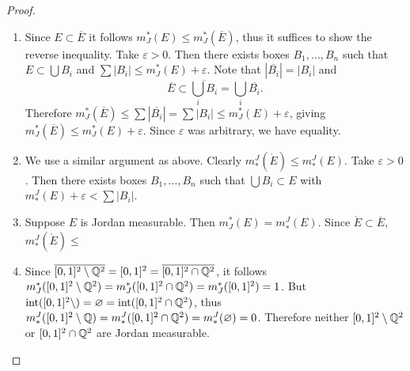 \documentclass{eeleyes}
\newcommand\conj[1]{\overline{#1}}
\newcommand\eps{\varepsilon}
\DeclareMathOperator{\interior}{int}
\begin{document}
\begin{proof}
    \hfill
    \begin{enumerate}[label=\roman*)]
        \item Since $E \subset \conj{E}$ it follows $m_J^*(E) \leq m_J^*(\conj{E})$, thus it suffices to show the reverse inequality. Take $\eps > 0$. Then there exists boxes $B_1, \ldots, B_n$ such that $E \subset \bigcup B_i$ and $\sum |B_i| \leq m_J^*(E) + \eps$. Note that $|\conj{B_i}| = |B_i|$ and
        \[
            \conj{E} \subset \conj{\bigcup_i B_i} = \bigcup_i \conj{B_i}
        .\]
        Therefore $m_J^*(\conj{E}) \leq \sum |\conj{B_i}| = \sum |B_i| \leq m_J^*(E) + \eps$, giving $m_J^*(\conj{E}) \leq m_J^*(E) + \eps$. Since $\eps$ was arbitrary, we have equality.

        \item We use a similar argument as above. Clearly $m^J_*(\mathring{E}) \leq m^J_*(E)$. Take $\eps > 0$. Then there exists boxes $B_1, \ldots, B_n$ such that $\bigcup B_i \subset E$ with $m^J_*(E) + \eps < \sum |B_i|$.

        \item Suppose $E$ is Jordan measurable. Then $m_J^*(E) = m^J_*(E)$. Since $\mathring{E} \subset \conj{E}$, $m^J_*(\mathring{E}) \leq $

        \item Since $\conj{[0,1]^2 \setminus \Q^2} = [0,1]^2 = \conj{[0,1]^2 \cap \Q^2}$, it follows $m_J^*([0,1]^2 \setminus \mathbb{Q}^2) = m_J^*([0,1]^2 \cap \mathbb{Q}^2) = m_J^*([0,1]^2) = 1$. But $\interior([0,1]^2 \setminus) = \varnothing = \interior([0,1]^2 \cap \Q^2)$, thus $m^J_*([0,1]^2 \setminus \mathbb{Q}) = m^J_*([0,1]^2 \cap \mathbb{Q}^2) = m^J_*(\varnothing) = 0$. Therefore neither $[0,1]^2 \setminus \mathbb{Q}^2$ or $[0,1]^2 \cap \mathbb{Q}^2$ are Jordan measurable.
    \end{enumerate}
\end{proof}
\end{document}
